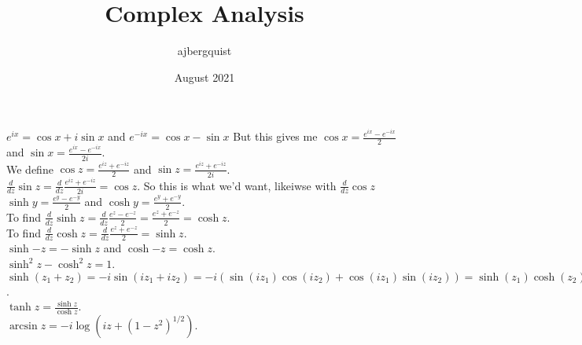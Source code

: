 \documentclass{article}
\title{Complex Analysis}
\author{ajbergquist }
\date{August 2021}
\theoremstyle{definition}
\newcommand{\deriv}{\frac{d}{dz}}
\begin{document}
 $e^{ix} = \cos x+ i\sin x$ and $e^{-ix} = \cos x-\sin x$ But this gives me $\cos x = \frac{e^{ix} - e^{-ix}}{2}$ and $\sin x = \frac{e^{ix} - e^{-ix}}{2i}$.\\

 We define $\cos z = \frac{e^{iz} + e^{-iz}}{2}$ and $\sin z = \frac{e^{iz} + e^{-iz}}{2i}$.\\

 $\deriv{\sin z} = \deriv{\frac{e^{iz} + e^{-iz}}{2i}} = \cos z$. So this is what we'd want, likeiwse with $\deriv{\cos{z}}$\\


 $\sinh{y} = \frac{e^y-e^{-y}}{2}$ and $\cosh{y} = \frac{e^y + e^{-y}}{2}$. 
\\
 To find $\deriv\sinh{z} = \deriv{\frac{e^z - e^{-z}}{2}} = \frac{e^z+ e^{-z}}{2} = \cosh{z}$.\\

 To find $\deriv \cosh{z} = \deriv{\frac{e^z + e^{-z}}{2}} = \sinh{z}$.\\

 $\sinh{-z} = -\sinh{z}$ and $\cosh{-z} = \cosh{z}$.\\

 $\sinh^2{z} - \cosh^2{z} = 1$.\\

 $\sinh(z_1 + z_2) = -i\sin(iz_1 + iz_2) = -i(\sin(iz_1)\cos(iz_2) + \cos(iz_1)\sin(iz_2)) = \sinh(z_1)\cosh(z_2) + \cosh(z_1)\sinh(z_2)$.\\

 $\tanh{z} = \frac{\sinh z}{\cosh z}$.\\

 $\arcsin{z} = -i\log(iz + (1-z^2)^{1/2})$.\\
\end{document}
